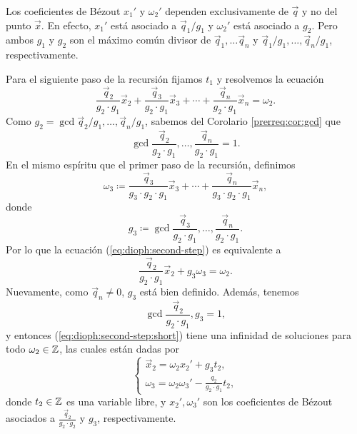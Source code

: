 \begin{observation}
	Los coeficientes de Bézout $x_1'$ y $\omega_2'$ dependen exclusivamente de $\vec{q}$ y no del
	punto $\vec{x}$. En efecto, $x_1'$ está asociado a $\vec{q}_1/g_1$ y $\omega_2'$ está asociado a
	$g_2$. Pero ambos $g_1$ y $g_2$ son el máximo común divisor de $\vec{q}_1, \ldots \vec{q}_n$ y
	$\vec{q}_1/g_1, \ldots, \vec{q}_n/g_1$, respectivamente. 
\end{observation}

Para el siguiente paso de la recursión fijamos $t_1$ y resolvemos la ecuación
\begin{equation}
	\label{eq:dioph:second-step}
	\frac{\vec{q}_2}{g_2 \cdot g_1}\vec{x}_2 +
	\frac{\vec{q}_3}{g_2 \cdot g_1}\vec{x}_3 +
	\cdots +
	\frac{\vec{q}_n}{g_2 \cdot g_1}\vec{x}_n
	= \omega_2.
\end{equation}
Como $g_2 = \gcd{\vec{q}_2/g_1, \ldots, \vec{q}_n/g_1}$, sabemos del Corolario \ref{prerreq:cor:gcd}
que
\begin{equation*}
	\gcd{\frac{\vec{q}_2}{g_2 \cdot g_1}, \ldots, \frac{\vec{q}_n}{g_2 \cdot g_1}} = 1.
\end{equation*}
En el mismo espíritu que el primer paso de la recursión, definimos
\begin{equation*}
	\omega_3 \coloneq \frac{\vec{q}_3}{g_3 \cdot g_2 \cdot g_1}\vec{x}_3 + \cdots + \frac{\vec{q}_n}{g_3
	\cdot g_2 \cdot g_1}\vec{x}_n,
\end{equation*}
donde
\begin{equation*}
	g_3 \coloneq  \gcd{\frac{\vec{q}_3}{g_2 \cdot g_1}, \ldots, \frac{\vec{q}_n}{g_2 \cdot g_1}}.
\end{equation*}
Por lo que la ecuación (\ref{eq:dioph:second-step}) es equivalente a
\begin{equation}
	\label{eq:dioph:second-step:short}
	\frac{\vec{q}_2}{g_2 \cdot g_1}\vec{x}_2 + g_3\omega_3 = \omega_2.
\end{equation}
Nuevamente, como $\vec{q}_n \neq 0$, $g_3$ está bien definido. Además, tenemos
\begin{equation*}
	\gcd{\frac{\vec{q}_2}{g_2 \cdot g_1}, g_3} = 1,
\end{equation*}
y entonces (\ref{eq:dioph:second-step:short}) tiene una infinidad de soluciones para todo $\omega_2 \in
\mathbb{Z}$, las cuales están dadas por
\begin{equation*}
	\begin{cases}
		\vec{x}_2 = \omega_2x_2' + g_3t_2, \\
		\omega_3 = \omega_2\omega_3' - \frac{q_2}{g_2 \cdot g_1}t_2,
	\end{cases}
\end{equation*}
donde $t_2 \in \mathbb{Z}$ es una variable libre, y $x_2', \omega_3'$ son los coeficientes de Bézout
asociados a $\frac{\vec{q}_2}{g_2 \cdot g_2}$ y $g_3$, respectivamente.

